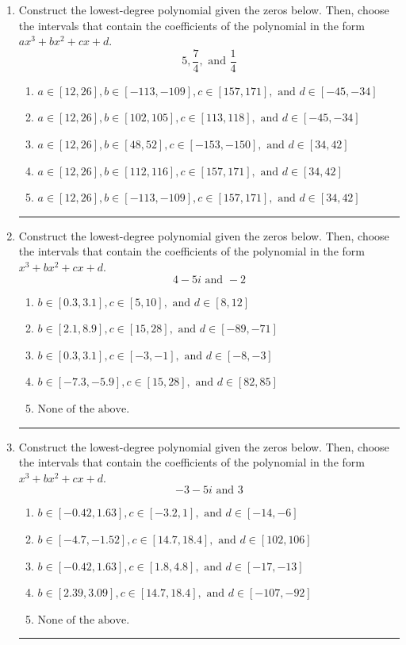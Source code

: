 \documentclass[14pt]{extbook}
\newcommand{\litem}[1]{\item#1\hspace*{-1cm}\rule{\textwidth}{0.4pt}}
\begin{document}
\begin{enumerate}
{\begin{enumerate}[label=\Alph*.]
\end{enumerate} }
\litem{
Construct the lowest-degree polynomial given the zeros below. Then, choose the intervals that contain the coefficients of the polynomial in the form $ax^3+bx^2+cx+d$.\[ 5, \frac{7}{4}, \text{ and } \frac{1}{4} \]\begin{enumerate}[label=\Alph*.]
\item \( a \in [12, 26], b \in [-113, -109], c \in [157, 171], \text{ and } d \in [-45, -34] \)
\item \( a \in [12, 26], b \in [102, 105], c \in [113, 118], \text{ and } d \in [-45, -34] \)
\item \( a \in [12, 26], b \in [48, 52], c \in [-153, -150], \text{ and } d \in [34, 42] \)
\item \( a \in [12, 26], b \in [112, 116], c \in [157, 171], \text{ and } d \in [34, 42] \)
\item \( a \in [12, 26], b \in [-113, -109], c \in [157, 171], \text{ and } d \in [34, 42] \)

\end{enumerate} }
\litem{
Construct the lowest-degree polynomial given the zeros below. Then, choose the intervals that contain the coefficients of the polynomial in the form $x^3+bx^2+cx+d$.\[ 4 - 5 i \text{ and } -2 \]\begin{enumerate}[label=\Alph*.]
\item \( b \in [0.3, 3.1], c \in [5, 10], \text{ and } d \in [8, 12] \)
\item \( b \in [2.1, 8.9], c \in [15, 28], \text{ and } d \in [-89, -71] \)
\item \( b \in [0.3, 3.1], c \in [-3, -1], \text{ and } d \in [-8, -3] \)
\item \( b \in [-7.3, -5.9], c \in [15, 28], \text{ and } d \in [82, 85] \)
\item \( \text{None of the above.} \)

\end{enumerate} }
\litem{
Construct the lowest-degree polynomial given the zeros below. Then, choose the intervals that contain the coefficients of the polynomial in the form $x^3+bx^2+cx+d$.\[ -3 - 5 i \text{ and } 3 \]\begin{enumerate}[label=\Alph*.]
\item \( b \in [-0.42, 1.63], c \in [-3.2, 1], \text{ and } d \in [-14, -6] \)
\item \( b \in [-4.7, -1.52], c \in [14.7, 18.4], \text{ and } d \in [102, 106] \)
\item \( b \in [-0.42, 1.63], c \in [1.8, 4.8], \text{ and } d \in [-17, -13] \)
\item \( b \in [2.39, 3.09], c \in [14.7, 18.4], \text{ and } d \in [-107, -92] \)
\item \( \text{None of the above.} \)


\end{enumerate}}
\end{enumerate}
\end{document}
